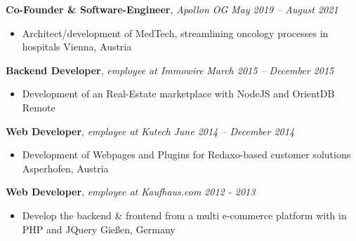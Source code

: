 \documentclass[9pt]{extarticle}
\begin{document}
\noindent
{\bf Co-Founder \& Software-Engineer}, \textit{Apollon OG}  \hfill \textit{May 2019 -- August 2021}
\begin{itemize}
\setlength\itemsep{0.05em}
\item Architect/development of MedTech, streamlining oncology processes in hospitals \hfill Vienna, Austria
\end{itemize}

\noindent
{\bf Backend Developer}, \textit{employee at Immowire}  \hfill \textit{March 2015 -- December 2015}
\begin{itemize}
\setlength\itemsep{0.05em}
\item Development of an Real-Estate marketplace with NodeJS and OrientDB \hfill Remote
\end{itemize}

\noindent
{\bf Web Developer}, \textit{employee at Kutech}  \hfill \textit{June 2014 -- December 2014}
\begin{itemize}
\setlength\itemsep{0.05em}
\item Development of Webpages and Plugins for Redaxo-based customer solutions \hfill Asperhofen, Austria
\end{itemize}

\noindent
{\bf Web Developer}, \textit{employee at Kaufhaus.com}  \hfill \textit{2012 - 2013}
\begin{itemize}
\setlength\itemsep{0.05em}
\item Develop the backend \& frontend from a multi e-commerce platform with in PHP and JQuery \hfill Gießen, Germany
\end{itemize}
\end{document}
